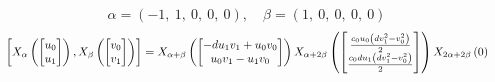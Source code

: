 \documentclass[11pt]{article}
\theoremstyle{definition}
\begin{document}
\[
\alpha = \left( -1, \  1, \  0, \  0, \  0\right), \quad \beta = \left( 1, \  0, \  0, \  0, \  0\right)
\]
\[
\scaletoalign{\textwidth}{\left[ X_{\alpha}\left(\left[\begin{matrix}u_{0}\\u_{1}\end{matrix}\right]\right), X_{\beta}\left(\left[\begin{matrix}v_{0}\\v_{1}\end{matrix}\right]\right) \right] = X_{\alpha + \beta}\left(\left[\begin{matrix}- d u_{1} v_{1} + u_{0} v_{0}\\u_{0} v_{1} - u_{1} v_{0}\end{matrix}\right]\right) X_{\alpha + 2\beta}\left(\left[\begin{matrix}\frac{c_{0} u_{0} \left(d v_{1}^{2} - v_{0}^{2}\right)}{2}\\\frac{c_{0} d u_{1} \left(d v_{1}^{2} - v_{0}^{2}\right)}{2}\end{matrix}\right]\right) X_{2\alpha + 2\beta}\left(0\right)}
\]
\end{document}
